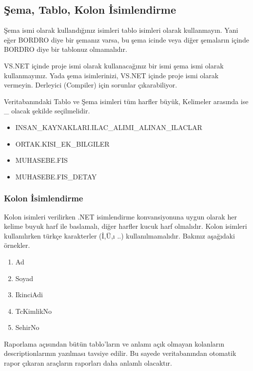 \documentclass[10pt,a4paper,draft]{article}
\begin{document}



\subsection{Şema, Tablo, Kolon İsimlendirme}

Şema ismi olarak kullandığınız isimleri tablo isimleri olarak kullanmayın. 
Yani eğer BORDRO diye bir şemanız varsa, bu şema icinde veya diğer şemaların içinde BORDRO diye bir tablonuz olmamalıdır.

VS.NET içinde proje ismi olarak kullanacağınız bir ismi şema ismi  olarak kullanmayınız.
Yada şema isimlerinizi, VS.NET içinde	proje ismi  olarak vermeyin.
Derleyici (Compiler)  için sorunlar çıkarabiliyor.		 


Veritabanındaki Tablo ve Şema isimleri tüm harfler büyük, Kelimeler arasında ise \_ olacak şekilde seçilmelidir.

\begin{itemize}

\item INSAN\_KAYNAKLARI.ILAC\_ALIMI\_ALINAN\_ILACLAR		 
\item ORTAK.KISI\_EK\_BILGILER		 
\item MUHASEBE.FIS		 
\item MUHASEBE.FIS\_DETAY 

\end{itemize}


\subsubsection{Kolon İsimlendirme}
Kolon isimleri verilirken .NET isimlendirme konvansiyonuna uygun olarak her kelime buyuk harf ile baslamalı, diğer harfler kucuk harf olmalıdır.
Kolon isimleri kullanılırken türkçe karakterler (İ,Ü,ı ..) kullanılmamalıdır.
Bakınız aşağıdaki örnekler.


\begin{enumerate}
\item Ad
\item Soyad
\item IkinciAdi
\item TcKimlikNo
\item SehirNo
\end{enumerate}

Raporlama açısından bütün tablo'ların ve anlamı açık olmayan kolanların descriptionlarının yazılması tavsiye edilir.
Bu sayede veritabanından otomatik rapor çıkaran araçların raporları daha anlamlı olacaktır.
	
\end{document}
